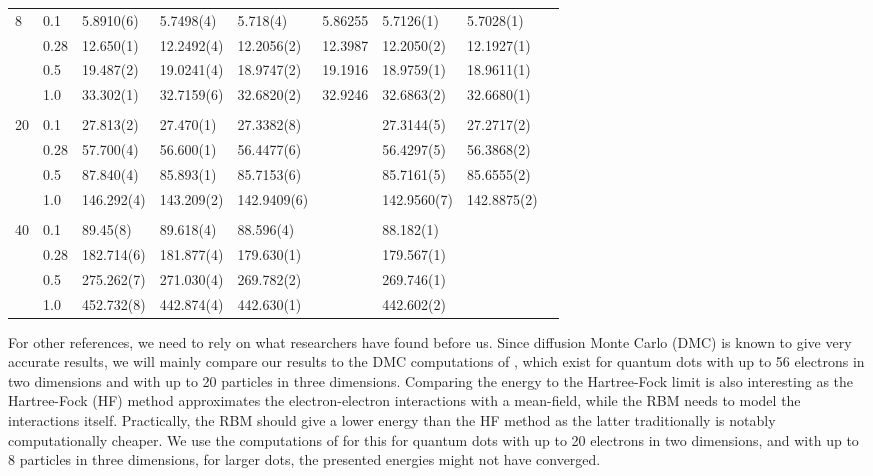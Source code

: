 {\begin{landscape}
\begin{table}
\begin{tabularx}{\hsize}{llR{2.65cm}R{2.65cm}R{2.65cm}R{2.65cm}R{2.65cm}R{2.65cm}R{2.65cm}}
				8 & 0.1 & 5.8910(6) & 5.7498(4) & 5.718(4) & 5.86255 & 5.7126(1) & 5.7028(1) \\ 
				& 0.28 & 12.650(1) & 12.2492(4) & 12.2056(2) & 12.3987 & 12.2050(2) & 12.1927(1) \\
				& 0.5 & 19.487(2) & 19.0241(4) & 18.9747(2) & 19.1916 & 18.9759(1) & 18.9611(1) \\
				& 1.0 & 33.302(1) & 32.7159(6) & 32.6820(2) & 32.9246 & 32.6863(2) & 32.6680(1) \\ 
				\hline \\
				
				20 & 0.1 & 27.813(2) & 27.470(1) & 27.3382(8) & & 27.3144(5) & 27.2717(2) \\ 
				& 0.28 & 57.700(4) & 56.600(1) & 56.4477(6) & & 56.4297(5) & 56.3868(2) \\
				& 0.5 & 87.840(4) & 85.893(1) & 85.7153(6) & & 85.7161(5) & 85.6555(2) \\
				& 1.0 & 146.292(4) & 143.209(2) & 142.9409(6) & & 142.9560(7) & 142.8875(2) \\ \hline \\
				
				40 & 0.1 & 89.45(8) & 89.618(4) & 88.596(4) & & 88.182(1) \\ 
				& 0.28 & 182.714(6) & 181.877(4) & 179.630(1) & & 179.567(1) \\
				& 0.5 & 275.262(7) & 271.030(4) & 269.782(2) & & 269.746(1) \\
				& 1.0 & 452.732(8) & 442.874(4) & 442.630(1) & & 442.602(2) \\ \hline\hline
			\end{tabularx}
		\end{table}
	\end{landscape}
}

For other references, we need to rely on what researchers have found before us. Since diffusion Monte Carlo (DMC) is known to give very accurate results, we will mainly compare our results to the DMC computations of \citet{hogberget_quantum_2013}, which exist for quantum dots with up to 56 electrons in two dimensions and with up to 20 particles in three dimensions. Comparing the energy to the Hartree-Fock limit is also interesting as the Hartree-Fock (HF) method approximates the electron-electron interactions with a mean-field, while the RBM needs to model the interactions itself. Practically, the RBM should give a lower energy than the HF method as the latter traditionally is notably computationally cheaper. We use the computations of \citet{mariadason_quantum_2018} for this for quantum dots with up to 20 electrons in two dimensions, and with up to 8 particles in three dimensions, for larger dots, the presented energies might not have converged. 

